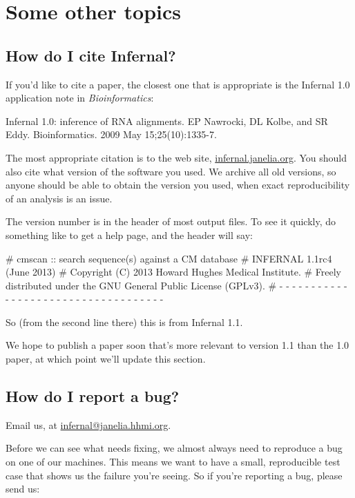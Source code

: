 \section{Some other topics}
\label{section:more}
\setcounter{footnote}{0}

\subsection{How do I cite Infernal?}

If you'd like to cite a paper, the closest one that is appropriate is
the Infernal 1.0 application note in \emph{Bioinformatics}:

Infernal 1.0: inference of RNA alignments. 
EP Nawrocki, DL Kolbe, and SR Eddy.
Bioinformatics. 2009 May 15;25(10):1335-7. 

The most appropriate citation is to the web site,
\url{infernal.janelia.org}. You should also cite what version of the
software you used. We archive all old versions, so anyone should be
able to obtain the version you used, when exact reproducibility of an
analysis is an issue.

The version number is in the header of most output files. To see it
quickly, do something like  to get a help page, and
the header will say:

\begin{sreoutput}
# cmscan :: search sequence(s) against a CM database
# INFERNAL 1.1rc4 (June 2013)
# Copyright (C) 2013 Howard Hughes Medical Institute.
# Freely distributed under the GNU General Public License (GPLv3).
# - - - - - - - - - - - - - - - - - - - - - - - - - - - - - - - - - - - -
\end{sreoutput}

So (from the second line there) this is from Infernal 1.1.

We hope to publish a paper soon that's more relevant to version 1.1
than the 1.0 paper, at which point we'll update this section.

\subsection{How do I report a bug?}

Email us, at \url{infernal@janelia.hhmi.org}.

Before we can see what needs fixing, we almost always need to
reproduce a bug on one of our machines. This means we want to have a
small, reproducible test case that shows us the failure you're seeing.
So if you're reporting a bug, please send us:

